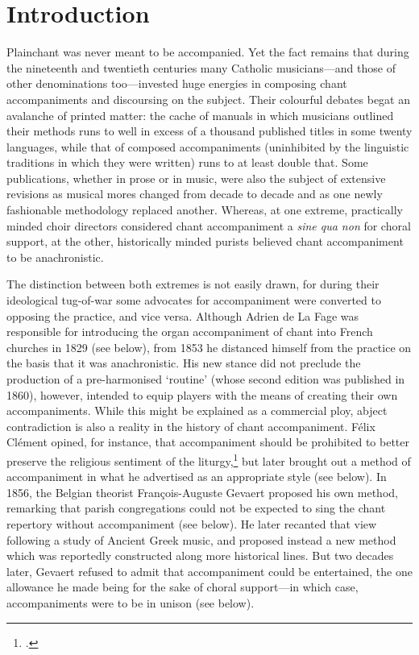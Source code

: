 \chapter*{Introduction}
Plainchant was never meant to be accompanied.
Yet the fact remains that during the nineteenth and twentieth centuries many Catholic musicians---and those of other denominations too---invested huge energies in composing chant accompaniments and discoursing on the subject.
Their colourful debates begat an avalanche of printed matter: the cache of manuals in which musicians outlined their methods runs to well in excess of a thousand published titles in some twenty languages, while that of composed accompaniments (uninhibited by the linguistic traditions in which they were written) runs to at least double that.
Some publications, whether in prose or in music, were also the subject of extensive revisions as musical mores changed from decade to decade and as one newly fashionable methodology replaced another.
Whereas, at one extreme, practically minded choir directors considered chant accompaniment a \emph{sine qua non} for choral support, at the other, historically minded purists believed chant accompaniment to be anachronistic.

The distinction between both extremes is not easily drawn, for during their ideological tug-of-war some advocates for accompaniment were converted to opposing the practice, and vice versa.
Although Adrien de La Fage was responsible for introducing the organ accompaniment of chant into French churches in 1829 (see  below), from 1853 he distanced himself from the practice on the basis that it was anachronistic.
His new stance did not preclude the production of a pre-harmonised `routine' (whose second edition was published in 1860), however, intended to equip players with the means of creating their own accompaniments.
While this might be explained as a commercial ploy, abject contradiction is also a reality in the history of chant accompaniment.
Félix Clément opined, for instance, that accompaniment should be prohibited to better preserve the religious sentiment of the liturgy,\footcite[356]{ClementMethodecompleteplainchant1872} but later brought out a method of accompaniment in what he advertised as an appropriate style (see  below).
In 1856, the Belgian theorist François-Auguste Gevaert proposed his own method, remarking that parish congregations could not be expected to sing the chant repertory without accompaniment (see  below).
He later recanted that view following a study of Ancient Greek music, and proposed instead a new method which was reportedly constructed along more historical lines.
But two decades later, Gevaert refused to admit that accompaniment could be entertained, the one allowance he made being for the sake of choral support---in which case, accompaniments were to be in unison (see  below).

